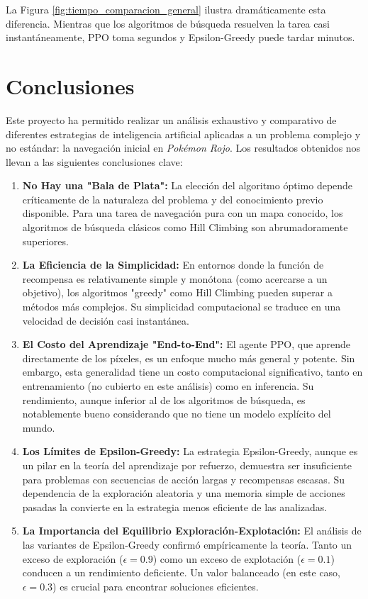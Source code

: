 \documentclass[12pt, oneside, openany]{book}
\begin{document}
La Figura \ref{fig:tiempo_comparacion_general} ilustra dramáticamente esta diferencia. Mientras que los algoritmos de búsqueda resuelven la tarea casi instantáneamente, PPO toma segundos y Epsilon-Greedy puede tardar minutos.

\section{Conclusiones}
\label{sec:conclusiones}

Este proyecto ha permitido realizar un análisis exhaustivo y comparativo de diferentes estrategias de inteligencia artificial aplicadas a un problema complejo y no estándar: la navegación inicial en \textit{Pokémon Rojo}. Los resultados obtenidos nos llevan a las siguientes conclusiones clave:

\begin{enumerate}
    \item \textbf{No Hay una "Bala de Plata":} La elección del algoritmo óptimo depende críticamente de la naturaleza del problema y del conocimiento previo disponible. Para una tarea de navegación pura con un mapa conocido, los algoritmos de búsqueda clásicos como Hill Climbing son abrumadoramente superiores.
    \item \textbf{La Eficiencia de la Simplicidad:} En entornos donde la función de recompensa es relativamente simple y monótona (como acercarse a un objetivo), los algoritmos "greedy" como Hill Climbing pueden superar a métodos más complejos. Su simplicidad computacional se traduce en una velocidad de decisión casi instantánea.
    \item \textbf{El Costo del Aprendizaje "End-to-End":} El agente PPO, que aprende directamente de los píxeles, es un enfoque mucho más general y potente. Sin embargo, esta generalidad tiene un costo computacional significativo, tanto en entrenamiento (no cubierto en este análisis) como en inferencia. Su rendimiento, aunque inferior al de los algoritmos de búsqueda, es notablemente bueno considerando que no tiene un modelo explícito del mundo.
    \item \textbf{Los Límites de Epsilon-Greedy:} La estrategia Epsilon-Greedy, aunque es un pilar en la teoría del aprendizaje por refuerzo, demuestra ser insuficiente para problemas con secuencias de acción largas y recompensas escasas. Su dependencia de la exploración aleatoria y una memoria simple de acciones pasadas la convierte en la estrategia menos eficiente de las analizadas.
    \item \textbf{La Importancia del Equilibrio Exploración-Explotación:} El análisis de las variantes de Epsilon-Greedy confirmó empíricamente la teoría. Tanto un exceso de exploración ($\epsilon=0.9$) como un exceso de explotación ($\epsilon=0.1$) conducen a un rendimiento deficiente. Un valor balanceado (en este caso, $\epsilon=0.3$) es crucial para encontrar soluciones eficientes.

\end{enumerate}
\end{document}
